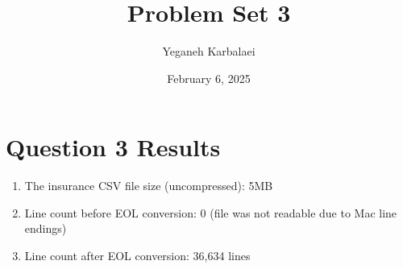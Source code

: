\documentclass{article}
\begin{document}
\title{Problem Set 3}
\author{Yeganeh Karbalaei}
\date{February 6, 2025}

\maketitle

\section*{Question 3 Results}

\begin{enumerate}
\item The insurance CSV file size (uncompressed): 5MB
\item Line count before EOL conversion: 0 (file was not readable due to Mac line endings)
\item Line count after EOL conversion: 36,634 lines
\end{enumerate}
\end{document}
